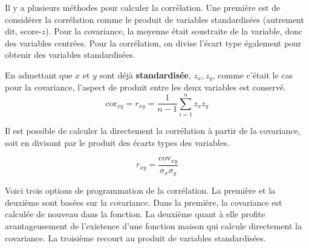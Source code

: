 \documentclass[
]{book}
\begin{document}
Il y a plusieurs méthodes pour calculer la corrélation. Une première est de considérer la corrélation comme le produit de variables standardisées (autrement dit, score-\(z\)). Pour la covariance, la moyenne était soustraite de la variable, donc des variables centrées. Pour la corrélation, on divise l'écart type également pour obtenir des variables standardisées.

En admettant que \(x\) et \(y\) sont déjà \textbf{standardisée}, \(z_x,z_y\), comme c'était le cas pour la covariance, l'aspect de produit entre les deux variables est conservé.
\[\text{cor}_{xy} = r_{xy}= \frac{1}{n-1}\sum_{i=1}^nz_xz_y\]

Il est possible de calculer la directement la corrélation à partir de la covariance, soit en divisant par le produit des écarts types des variables.

\[r_{xy} = \frac{\text{cov}_{xy}}{\sigma_x\sigma_y}\]

Voici trois options de programmation de la corrélation. La première et la deuxième sont basées sur la covariance. Dans la première, la covariance est calculée de nouveau dans la fonction. La deuxième quant à elle profite avantageusement de l'existence d'une fonction maison qui calcule directement la covariance. La troisième recourt au produit de variables standardisées.
\end{document}
